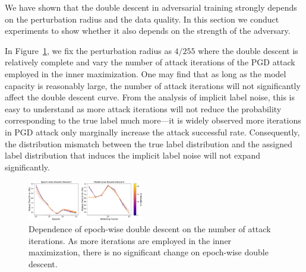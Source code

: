 

We have shown that the double descent in adversarial training strongly depends on the perturbation radius and the data quality. In this section we conduct experiments to show whether it also depends on the strength of the adversary. 

In Figure~\ref{fig:dependence-iteration}, we fix the perturbation radius as $4/255$ where the double descent is relatively complete and vary the number of attack iterations of the PGD attack employed in the inner maximization. One may find that as long as the model capacity is reasonably large, the number of attack iterations will not significantly affect the double descent curve.
From the analysis of implicit label noise, this is easy to understand as more attack iterations will not reduce the probability corresponding to the true label much more---it is widely observed more iterations in PGD attack only marginally increase the attack successful rate. Consequently, the distribution mismatch between the true label distribution and the assigned label distribution that induces the implicit label noise will not expand significantly.


\begin{figure}[!ht]
  \centering
  \includegraphics[width=0.45\textwidth]{figures/dependence-iteration.pdf}
  \caption{Dependence of epoch-wise double descent on the number of attack iterations. As more iterations are employed in the inner maximization, there is no significant change on epoch-wise double descent.
  }
\label{fig:dependence-iteration}
\end{figure}

 

